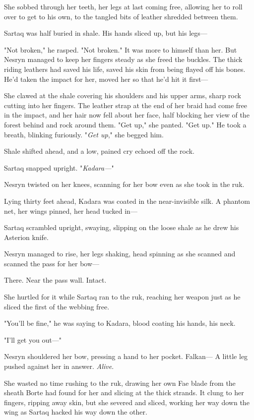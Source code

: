 She sobbed through her teeth, her legs at last coming free, allowing her to roll over to get to his own, to the tangled bits of leather shredded between them.

Sartaq was half buried in shale. His hands sliced up, but his legs---

"Not broken," he rasped. "Not broken." It was more to himself than her. But Nesryn managed to keep her fingers steady as she freed the buckles. The thick riding leathers had saved his life, saved his skin from being flayed off his bones. He'd taken the impact for her, moved her so that he'd hit it first---

She clawed at the shale covering his shoulders and his upper arms, sharp rock cutting into her fingers. The leather strap at the end of her braid had come free in the impact, and her hair now fell about her face, half blocking her view of the forest behind and rock around them. "Get up," she panted. "Get up." He took a breath, blinking furiously. "\emph{Get up}," she begged him.

Shale shifted ahead, and a low, pained cry echoed off the rock.

Sartaq snapped upright. "\emph{Kadara---}"

Nesryn twisted on her knees, scanning for her bow even as she took in the ruk.

Lying thirty feet ahead, Kadara was coated in the near-invisible silk. A phantom net, her wings pinned, her head tucked in---

Sartaq scrambled upright, swaying, slipping on the loose shale as he drew his Asterion knife.

Nesryn managed to rise, her legs shaking, head spinning as she scanned and scanned the pass for her bow---

There. Near the pass wall. Intact.

She hurtled for it while Sartaq ran to the ruk, reaching her weapon just as he sliced the first of the webbing free.

"You'll be fine," he was saying to Kadara, blood coating his hands, his neck.

"I'll get you out---"

Nesryn shouldered her bow, pressing a hand to her pocket. Falkan--- A little leg pushed against her in answer. \emph{Alive}.

She wasted no time rushing to the ruk, drawing her own Fae blade from the sheath Borte had found for her and slicing at the thick strands. It clung to her fingers, ripping away skin, but she severed and sliced, working her way down the wing as Sartaq hacked his way down the other.

